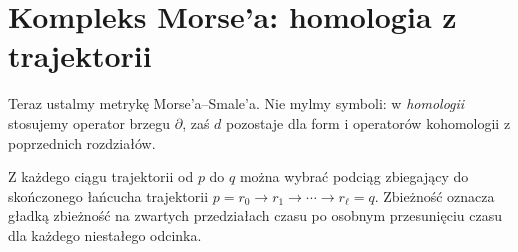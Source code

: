 \section{Kompleks Morse'a: homologia z trajektorii}
\label{sec:kompleks-morse-17}

Teraz ustalmy metrykę Morse'a--Smale'a.
Nie mylmy symboli: w \emph{homologii}
stosujemy operator brzegu $\partial$,
zaś $d$ pozostaje dla form
i operatorów kohomologii
z poprzednich rozdziałów.

\begin{lemat}
\label{lem:zwartosc-lamana-17}
Z każdego ciągu trajektorii od $p$ do $q$ można wybrać
podciąg zbiegający do skończonego łańcucha trajektorii
$p=r_0\to r_1\to\cdots\to r_\ell=q$.
Zbieżność oznacza gładką zbieżność na zwartych
przedziałach czasu po osobnym przesunięciu czasu
dla każdego niestałego odcinka.
\end{lemat}
